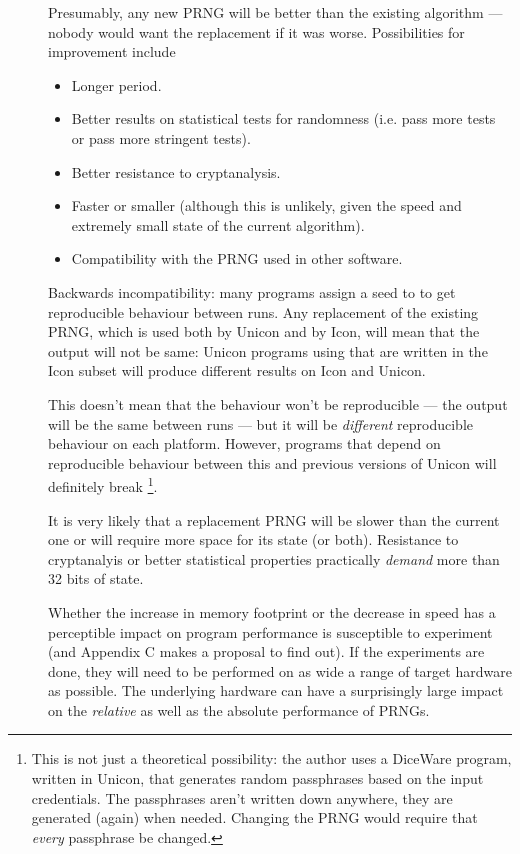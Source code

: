 \documentclass[letterpaper,12pt]{article}
\begin{document}
\begin{description}

\item[\GoodThing]
  Presumably, any new PRNG will be better than the existing
  algorithm --- nobody would want the replacement if it was
  worse. Possibilities for improvement include
  \begin{itemize}
  \item Longer period.
  \item Better results on statistical tests for randomness (i.e. pass more
    tests or pass more stringent tests).
  \item Better resistance to cryptanalysis.
  \item Faster or smaller (although this is unlikely, given the speed and
    extremely small state of the current algorithm).
  \item Compatibility with the PRNG used in other software.
  \end{itemize}

\item[\BadThing]
  Backwards incompatibility: many programs assign a seed to \rndkwd to get
  reproducible behaviour between runs.  Any replacement of the existing
  PRNG, which is used both by Unicon and by Icon, will mean that the output
  will not be same: Unicon programs using \rndkwd that are written in the
  Icon subset will produce different results on Icon and Unicon.

  This doesn't mean that the behaviour won't be reproducible --- the output
  will be the same between runs --- but it will be {\em different}
  reproducible behaviour on each platform. However, programs that depend on
  reproducible behaviour between this and previous versions of Unicon will
  definitely break%
  \footnote{
    This is not just a theoretical possibility: the author uses a DiceWare
    program, written in Unicon, that generates random passphrases based on
    the input credentials. The passphrases aren't written down anywhere,
    they are generated (again) when needed. Changing the PRNG would require
    that {\em every} passphrase be changed.
  }.

\item[\PossiblyBadThing]
  It is very likely that a replacement PRNG will be slower than the current
  one or will require more space for its state (or both). Resistance to
  cryptanalyis or better statistical properties practically {\em demand} more
  than 32 bits of state.

  Whether the increase in memory footprint or the decrease in speed has a
  perceptible impact on program performance is susceptible to
  experiment (and Appendix C makes a proposal to find out).
  If the experiments are done, they will need to be performed on as
  wide a range of target hardware as possible. The underlying hardware can
  have a surprisingly large impact on the {\em relative} as well as the
  absolute performance of PRNGs\cite{Bernstein:cypherSpeed}.

\end{description}
\end{document}
